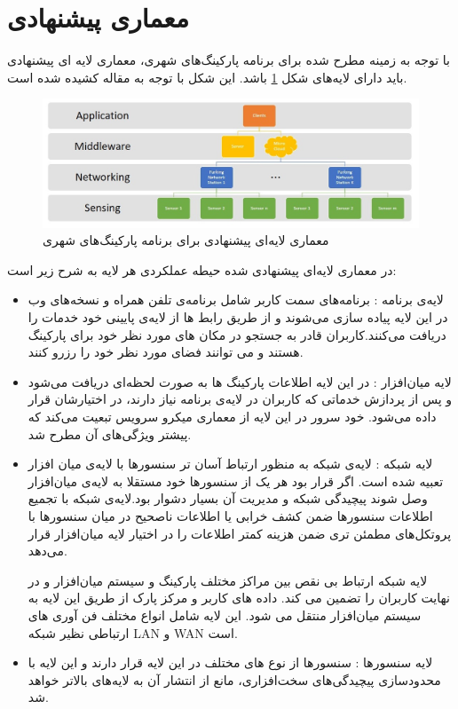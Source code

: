 \section{معماری پیشنهادی}
با توجه به زمینه مطرح شده برای برنامه پارکینگ‌های شهری، معماری لایه ای پیشنهادی باید دارای لایه‌های شکل \ref{fig:parking_layer} باشد. این شکل با توجه به مقاله \cite{ahmed2019blockchain}
کشیده شده است.
\begin{figure}[h]
\centering
\includegraphics[scale=0.6]{parking_layer.jpg}
\caption{معماری لایه‌ای پیشنهادی برای برنامه پارکینگ‌های شهری}
\label{fig:parking_layer}
\end{figure}
در معماری لایه‌ای پیشنهادی شده حیطه عملکردی هر لایه به شرح زیر است:
\begin{itemize}
\item
لایه‌ی برنامه : برنامه‌های سمت کاربر شامل برنامه‌ی تلفن همراه و نسخه‌های وب در این لایه پیاده سازی می‌شوند و از طریق رابط ها از لایه‌ی پایینی خود خدمات را دریافت می‌کنند.کاربران قادر به جستجو در مکان های مورد نظر خود برای پارکینگ هستند و می توانند فضای مورد نظر خود را رزرو کنند.
\item
لایه میان‌افزار : در این لایه اطلاعات پارکینگ ها به صورت لحظه‌ای دریافت می‌شود و پس از پردازش خدماتی که کاربران در لایه‌ی برنامه نیاز دارند، در اختیارشان قرار داده می‌شود. خود سرور در این لایه از معماری میکرو سرویس تبعیت می‌کند که پیشتر ویژگی‌های آن مطرح شد.
\item
لایه شبکه  : لایه‌ی شبکه به منظور ارتباط آسان تر سنسور‌ها با لایه‌ی میان افزار تعبیه شده است. اگر قرار بود هر یک از سنسور‌ها خود مستقلا به لایه‌ی میان‌افزار وصل شوند پیچیدگی شبکه و مدیریت آن بسیار دشوار بود.لایه‌ی شبکه با تجمیع اطلاعات سنسور‌ها ضمن کشف خرابی یا اطلاعات ناصحیح در میان سنسور‌ها با پروتکل‌های مطمئن تری ضمن هزینه کمتر اطلاعات را در اختیار لایه میان‌افزار قرار می‌دهد.

لایه شبکه ارتباط بی نقص بین مراکز مختلف پارکینگ و سیستم میان‌افزار و در نهایت کاربران را تضمین می کند. داده های کاربر و مرکز پارک از طریق این لایه به سیستم میان‌افزار منتقل می شود. این لایه شامل انواع مختلف فن آوری های ارتباطی نظیر شبکه LAN و WAN است.
\item
لایه سنسور‌ها : سنسور‌ها از نوع های مختلف در این لایه قرار دارند و این لایه با محدود‌سازی پیچیدگی‌های سخت‌افزاری، مانع از انتشار آن به لایه‌های بالاتر خواهد شد.
\end{itemize}
